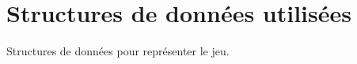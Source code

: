 \chapter{Structures de données utilisées} \label{chapter:structures-donnees}

Structures de données pour représenter le jeu.

